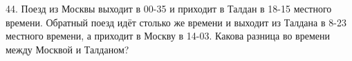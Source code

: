 44. Поезд из Москвы выходит в 00-35 и приходит в Талдан в 18-15 местного времени. Обратный поезд идёт столько же времени и выходит из Талдана в 8-23 местного времени, а приходит в Москву в 14-03. Какова разница во времени между Москвой и Талданом?\\
